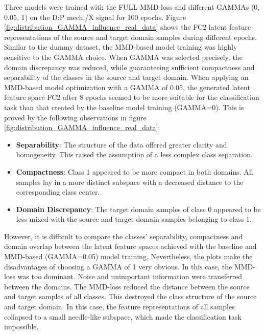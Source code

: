 Three models were trained with the FULL MMD-loss and different GAMMAs (0, 0.05, 1) on the D:P mech./X signal for 100 epochs. Figure \ref{fig:distribution_GAMMA_influence_real_data} 
shows the FC2 latent feature representations of the source and target domain samples during
different epochs. Similar to the dummy dataset, the MMD-based model training was highly sensitive to the GAMMA choice. When GAMMA was selected precisely, the domain discrepancy was reduced, while guaranteeing sufficient compactness and separability of the classes in the source and target domain. When applying an MMD-based model optimization with a GAMMA of 0.05, the generated latent feature space FC2 after 8 epochs seemed to be more suitable for the classification task than that created by the baseline model training (GAMMA=0). This is proved by the following observations in figure \ref{fig:distribution_GAMMA_influence_real_data}:
\begin{itemize}
    \item \textbf{Separability}: The structure of the data offered greater clarity and homogeneity. This raised the assumption of a less complex class separation.
    \item \textbf{Compactness}: Class 1 appeared to be more compact in both domains. All samples lay in a more distinct subspace with a decreased distance to the corresponding class center.
    \item \textbf{Domain Discrepancy}: The target domain samples of class 0 appeared to be less mixed with the source and target domain samples belonging to class 1. 
\end{itemize}

However, it is difficult to compare the classes' separability, compactness and domain overlap between the latent feature spaces achieved with the baseline and MMD-based (GAMMA=0.05) model training. Nevertheless, the plots make the disadvantages of choosing a GAMMA of 1 very obvious. In this case, the MMD-loss was too dominant. Noise and unimportant information were transferred between the domains. The MMD-loss reduced the distance between the source and target samples of all classes. This destroyed the class structure of the source and target domain. In this case, the feature representations of all samples collapsed to a small needle-like subspace, which made the classification task impossible.

